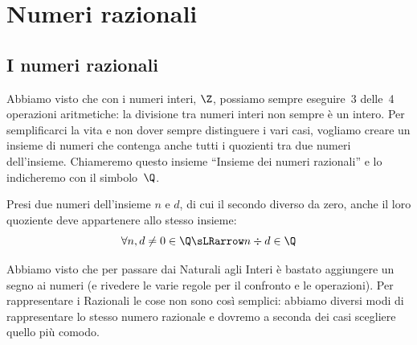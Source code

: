 


\newcommand*\canc[1]{%
  \mathchoice
    {\scriptstyle#1}
    {\scriptstyle#1}
    {\scriptscriptstyle#1}
    {\scriptscriptstyle#1}
}

\newcommand*\Dcancelto[2][0]{%
  \kern9pt%
  \begin{tikzpicture}[baseline=(current bounding box.center).anchor=west]
    \node[anchor=east,inner sep=2pt] (a) {#2};
    \draw[->] ($(a.north west)+(1pt,-2pt)$) -- ($(a.south east)+(0pt,2pt)$) 
node at ($(a.south east)+(4pt,1pt)$) {$\canc{#1}$};
\end{tikzpicture}
}

\chapter{Numeri razionali}

\section{I numeri razionali}
\label{sec:razionali_razionali}

Abbiamo visto che con i numeri interi, $\Z$, possiamo sempre eseguire~3 
delle~4 operazioni aritmetiche: la divisione tra numeri interi non sempre è 
un intero. Per semplificarci la vita e non dover sempre distinguere i vari 
casi, vogliamo creare un insieme di numeri che contenga anche tutti i 
quozienti tra due numeri dell'insieme. 
Chiameremo questo insieme ``Insieme dei numeri razionali'' e lo 
indicheremo con il simbolo~$\Q$.

Presi due numeri dell'insieme $n$ e $d$, di cui il secondo diverso da zero, 
anche il loro quoziente deve appartenere allo stesso insieme:
\[\forall n, d \neq 0 \in \Q \sLRarrow n \div d \in \Q\]

Abbiamo visto che per passare dai Naturali agli Interi è bastato aggiungere 
un segno ai numeri (e rivedere le varie regole per il confronto e le 
operazioni).
Per rappresentare i Razionali le cose non sono così semplici: abbiamo 
diversi modi di rappresentare lo stesso numero razionale e dovremo a 
seconda dei casi scegliere quello più comodo.


